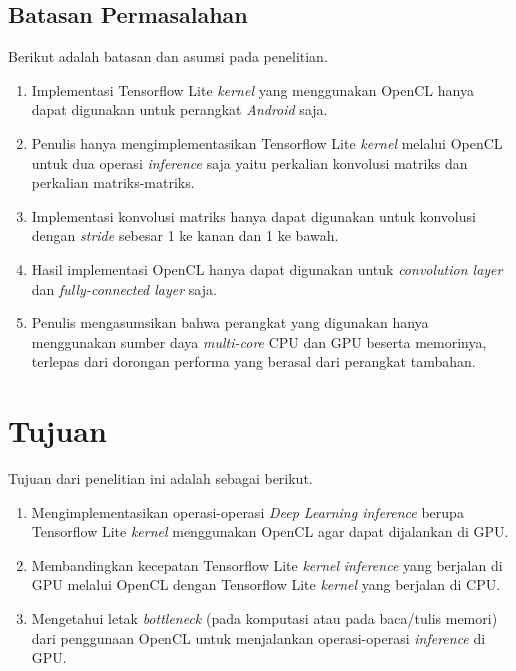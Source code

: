 \subsection{Batasan Permasalahan}
Berikut adalah batasan dan asumsi pada penelitian.
\begin{enumerate}
\item Implementasi Tensorflow Lite \textit{kernel} yang menggunakan OpenCL hanya dapat digunakan untuk perangkat \textit{Android} saja.
\item Penulis hanya mengimplementasikan Tensorflow Lite \textit{kernel} melalui OpenCL untuk dua operasi \textit{inference} saja yaitu perkalian konvolusi matriks dan perkalian matriks-matriks.
\item Implementasi konvolusi matriks hanya dapat digunakan untuk konvolusi dengan \textit{stride} sebesar 1 ke kanan dan 1 ke bawah.
\item Hasil implementasi OpenCL hanya dapat digunakan untuk \textit{convolution layer} dan \textit{fully-connected layer} saja.
\item Penulis mengasumsikan bahwa perangkat yang digunakan hanya menggunakan sumber daya \textit{multi-core} CPU dan GPU beserta memorinya, terlepas dari dorongan performa yang berasal dari perangkat tambahan.
\end{enumerate}

\section{Tujuan}
Tujuan dari penelitian ini adalah sebagai berikut.
\begin{enumerate}
\item Mengimplementasikan operasi-operasi \textit{Deep Learning inference} berupa Tensorflow Lite \textit{kernel} menggunakan OpenCL agar dapat dijalankan di GPU.
\item Membandingkan kecepatan Tensorflow Lite \textit{kernel} \textit{inference} yang berjalan di GPU melalui OpenCL dengan Tensorflow Lite \textit{kernel} yang berjalan di CPU.
\item Mengetahui letak \textit{bottleneck} (pada komputasi atau pada baca/tulis memori) dari penggunaan OpenCL untuk menjalankan operasi-operasi \textit{inference} di GPU.

\end{enumerate}



